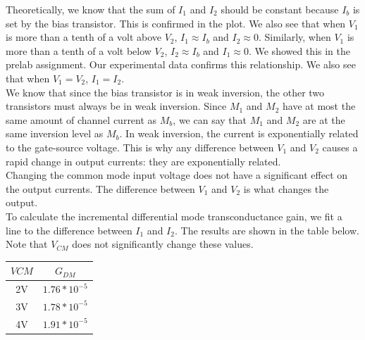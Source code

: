 \documentclass{article}
\begin{document}
Theoretically, we know that the sum of $I_1$ and $I_2$ should be constant because $I_b$ is set by the bias transistor. This is confirmed in the plot. We also see that when $V_1$ is more than a tenth of a volt above $V_2$, $I_1 \approx I_b$ and $I_2 \approx 0$. Similarly, when $V_1$ is more than a tenth of a volt below $V_2$, $I_2 \approx I_b$ and $I_1 \approx 0$. We showed this in the prelab assignment. Our experimental data confirms this relationship. We also see that when $V_1=V_2$, $I_1=I_2$.\\

We know that since the bias transistor is in weak inversion, the other two transistors must always be in weak inversion. Since $M_1$ and $M_2$ have at most the same amount of channel current as $M_b$, we can say that $M_1$ and $M_2$ are at the same inversion level as $M_b$. In weak inversion, the current is exponentially related to the gate-source voltage. This is why any difference between $V_1$ and $V_2$ causes a rapid change in output currents: they are exponentially related. \\

Changing the common mode input voltage does not have a significant effect on the output currents. The difference between $V_1$ and $V_2$ is what changes the output.\\

To calculate the incremental differential mode transconductance gain, we fit a line to the difference between $I_1$ and $I_2$. The results are shown in the table below. Note that $V_{CM}$ does not significantly change these values.
\\
\begin{center}
\begin{tabular} {|c|c|}
\hline
$V{CM}$ & $G_{DM}$ \\ 
\hline
2V & $1.76 *10^{-5}$ \\
3V & $1.78 *10^{-5}$ \\
4V & $1.91 *10^{-5}$ \\
\hline
\end{tabular}

\end{center}
\end{document}
